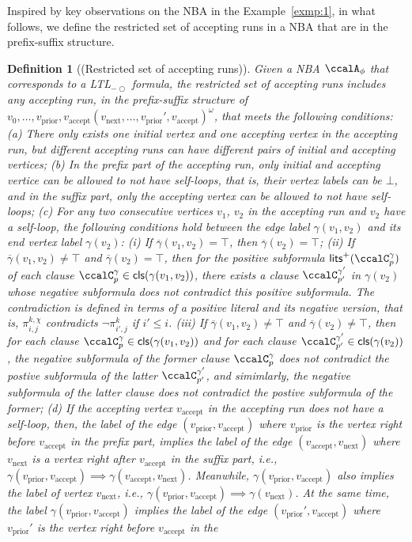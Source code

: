 \documentclass[Afour,sageh,times]{sagej}
\newtheorem{defn}[thm]{Definition}
\newcommand{\ltl}{ {\it LTL}$_{-\bigcirc}$ }
\newcommand{\autop}{\ccalA_{\phi}}
\newcommand{\vertex}[1]{v_{\text{#1}}}
\renewcommand{\ap}[3]{\mathcal{\pi}_{{#1},{#2}}^{#3}}
\begin{document}
Inspired by key observations on the NBA in the Example~\ref{exmp:1}, in what follows, we define the restricted set of accepting runs in a NBA that are in the prefix-suffix structure.
\begin{defn}[(Restricted set of accepting runs)]\label{defn:run}
  Given a NBA $\autop$ that corresponds to a \ltl formula, the  restricted set of accepting runs includes any accepting run, in the prefix-suffix structure of $v_0, \ldots, \vertex{prior}, \vertex{accept} (\vertex{next}, \ldots, \vertex{prior}', \vertex{accept})^\omega$, that meets the following conditions: (a)\label{cond:a} There only exists one initial vertex and one  accepting vertex in the accepting run, but different accepting runs can have different pairs of initial and accepting vertices; (b)\label{cond:b} In the prefix part of the accepting run, only initial and accepting vertice can be allowed to not have self-loops, that is, their vertex labels  can be $\bot$, and in the suffix part,  only the accepting vertex can be allowed to not have self-loops; (c)\label{cond:c} For any two consecutive vertices $v_1$, $v_2$ in the accepting run and $v_2$ have a self-loop, the following conditions hold between the edge label $\gamma(v_1,v_2)$ and its end vertex label $\gamma(v_2)$: {\it (i)} If $\overline{\gamma}(v_1, v_2) = \top$, then $\overline{\gamma}(v_2) = \top$; {\it (ii)} If $\overline{\gamma}(v_1, v_2) \neq \top$ and $\overline{\gamma}(v_2)= \top$, then for the positive subformula $\mathsf{lits}^+(\ccalC_p^\gamma)$ of each clause $\ccalC_p^\gamma \in \mathsf{cls}(\gamma(v_1, v_2))$, there exists a clause $\ccalC_{p'}^{\gamma'} $ in $\gamma(v_2)$ whose negative subformula does  not contradict this positive subformula. The contradiction is defined in terms of a positive literal and its negative version, that is, $\ap{i}{j}{k,\chi}$  contradicts  $\neg\ap{i'}{j}{k}$ if $i' \leq i$. {\it (iii)} If $\overline{\gamma}(v_1, v_2) \neq \top$ and $\overline{\gamma}(v_2) \neq \top$, then for each clause $\ccalC_p^\gamma \in \mathsf{cls}(\gamma(v_1, v_2))$ and for each clause $\ccalC_{p'}^{\gamma'} \in \mathsf{cls}(\gamma(v_2))$, the negative subformula of the former clause $\ccalC_p^\gamma$ does not contradict the postive subformula of the latter $\ccalC_{p'}^{\gamma'}$, and simimlarly, the negative subformula of the latter clause does not contradict the postive subformula of the former; (d)\label{cond:d}  If the accepting vertex $\vertex{accept}$ in the accepting run does not have a self-loop, then, the label of the edge $(\vertex{prior}, \vertex{accept})$ where $\vertex{prior}$ is the vertex right before $\vertex{accept}$ in the prefix part, implies the label of the edge $(\vertex{accept}, \vertex{next})$ where $\vertex{next}$ is a vertex right after $\vertex{accept}$ in the suffix part, i.e., $\gamma(\vertex{prior}, \vertex{accept}) \implies  \gamma(\vertex{accept}, \vertex{next})$. Meanwhile, $\gamma(\vertex{prior}, \vertex{accept})$ also implies the label of vertex $\vertex{next}$, i.e., $\gamma(\vertex{prior}, \vertex{accept}) \implies  \gamma(\vertex{next})$. At the same time, the label $\gamma(\vertex{prior}, \vertex{accept})$ implies the label of the edge $(\vertex{prior}', \vertex{accept})$ where $\vertex{prior}'$ is the vertex right before $\vertex{accept}$ in the 
\end{defn}
\end{document}
